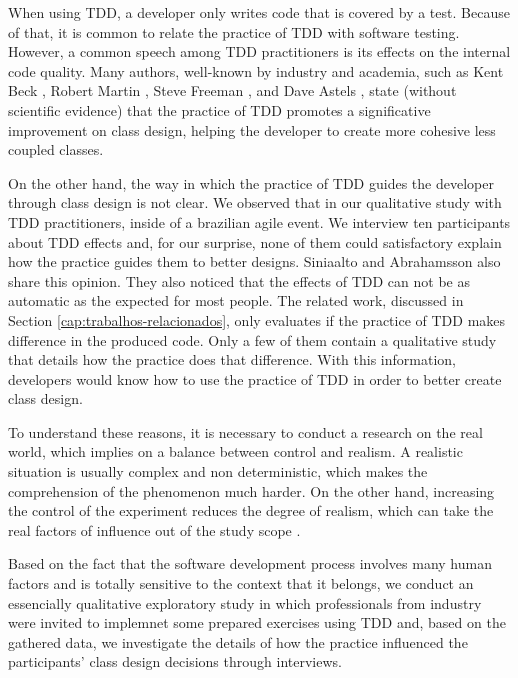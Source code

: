 \documentclass[conference]{IEEEtran}
\begin{document}
When using TDD, a developer only writes code that is covered by a test. Because
of that, it is common to relate the practice of TDD with software testing. However,
a common speech among TDD practitioners is its effects on the internal code quality.
Many authors, well-known by industry and academia, such as Kent Beck \cite{TDDByExample}, 
Robert Martin \cite{agile-ppp}, Steve Freeman \cite{GOOS}, and Dave Astels \cite{astels-tdd}, 
state (without scientific evidence) that the practice of TDD promotes a significative
improvement on class design, helping the developer to create more cohesive less coupled
classes.

On the other hand, the way in which the practice of TDD guides the developer
through class design is not clear. We observed that in our qualitative study
with TDD practitioners, inside of a brazilian agile event. We interview
ten participants about TDD effects \cite{aniche-wbma} and, for our surprise,
none of them could satisfactory explain how the practice guides them to better
designs.
Siniaalto and Abrahamsson \cite{alarming-results} also share this opinion. They also
noticed that the effects of TDD can not be as automatic as the expected for most people.
The related work, discussed in Section \ref{cap:trabalhos-relacionados},
only evaluates if the practice of TDD makes difference in the produced code. Only a few
of them contain a qualitative study that details how the practice does that difference.
With this information, developers would know how to use the practice of TDD in order to 
better create class design.

To understand these reasons, it is necessary to conduct a research on the real world, which
implies on a balance between control and realism. A realistic situation is usually
complex and non deterministic, which makes the comprehension of the phenomenon much
harder. On the other hand, increasing the control of the experiment reduces the
degree of realism, which can take the real factors of influence out of the study
scope \cite{guidelines-case-study}.

Based on the fact that the software development process involves many
human factors and is totally sensitive to the context that it belongs,
we conduct an essencially qualitative exploratory study in which professionals
from industry were invited to implemnet some prepared exercises using TDD and,
based on the gathered data, we investigate the details of how the practice influenced
the participants' class design decisions through interviews.
\end{document}
